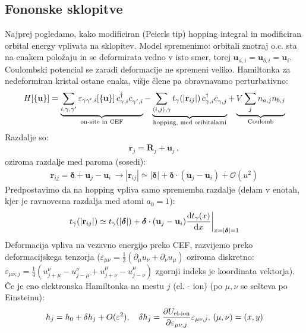 \documentclass[a4paper,10pt]{article}
\renewcommand{\vec}[1]{\mathbf{#1}}
\begin{document}
\subsection{Fononske sklopitve}
Najprej pogledamo, kako modificiran (Peierls tip) hopping integral in modificiran orbital energy vplivata na sklopitev. Model spremenimo: orbitali znotraj o.c. sta na enakem položaju in se deformirata vedno v isto smer, torej $\vec{u}_{a,i}=\vec{u}_{b,i}=\vec{u}_{i}$. Coulombski potencial se zaradi deformacije ne spremeni veliko. Hamiltonka za nedeformiran kristal ostane enaka, višje člene pa obravnavamo perturbativno: 
\begin{align}
  H[\{\mathbf{u}\}] = \underbrace{\sum_{i, \gamma, \gamma'} \varepsilon_{\gamma\gamma',i}[\{\mathbf{u}\}] \, c_{\gamma,i}^\dagger c_{\gamma',i}^{\vphantom\dagger}}_{\text{on-site in CEF}} - \underbrace{\sum_{\langle i,j \rangle, \gamma} t_{\gamma}(|\mathbf{r}_{ij}|) \, c_{\gamma,i}^\dagger c_{\gamma,j}^{\vphantom\dagger}}_{\text{hopping, med oribitalami}} + \underbrace{V \sum_j n_{a,j} n_{b,j}}_{\text{Coulomb}}
\end{align}
Razdalje so: 
\begin{align}
\vec r_{j}=\vec R_j+\vec u_{j}\,,
\end{align}
oziroma razdalje med paroma (sosedi): 
\begin{align}
\vec r_{ij}=\bm \delta +\vec u_{j} -\vec u_{i}\,\to |\vec r_{ij}| \simeq |\bm \delta| + \bm \delta \cdot (\vec u_{j} -\vec u_{i}) + \mathcal{O}(u^2)
\end{align}
Predpostavimo da na hopping vpliva samo sprememba razdalje (delam v enotah, kjer je ravnovesna razdalja med atomi $a_0=1$):
\begin{align}
  t_{\gamma}(|\mathbf{r}_{ij}|) \simeq t_{\gamma}(|\bm \delta|) + \bm \delta \cdot (\vec u_{j} -\vec u_{i}) \dv{t_\gamma(x)}{x}\bigg|_{x=|\bm\delta|=1}
\end{align} 
Deformacija vpliva na vezavno energijo preko CEF, razvijemo preko deformacijskega tenzorja ($\varepsilon_{\mu\nu}=\frac12(\partial_\mu u_\nu+\partial_\nu u_\mu)$ oziroma diskretno: $\varepsilon_{\mu\nu,j} = \frac14(u_{j+\mu}^\nu-u_{j-\mu}^\nu + u_{j+\nu}^\mu-u_{j-\nu}^\mu)$ zgornji indeks je koordinata vektorja). Če je eno elektronska Hamiltonka na mestu $j$ (el. - ion) (po $\mu, \nu$ se sešteva po Einsteinu): 
\begin{align}
h_j=h_0+\delta h_{j}+O(\varepsilon^2), \quad \delta h_j= \pdv{U_{\text{el-ion}}}{\varepsilon_{\mu \nu,j}}\varepsilon_{\mu \nu,j}, \,(\mu, \nu) = (x, y)
\end{align}
\end{document}
